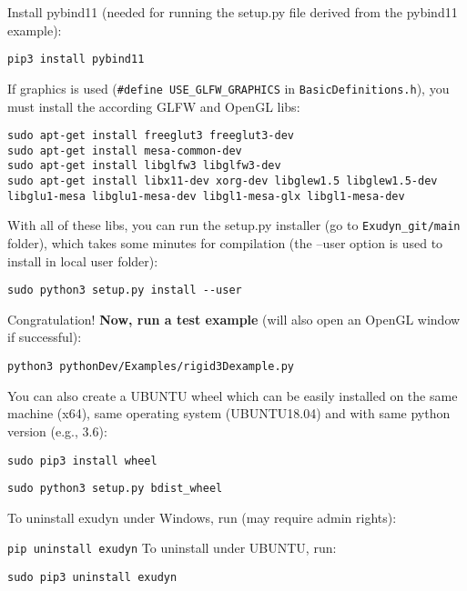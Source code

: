 \noindent Install pybind11 (needed for running the setup.py file derived from the pybind11 example):
\begin{lstlisting}[firstnumber=1]
pip3 install pybind11
\end{lstlisting}

\noindent If graphics is used (\texttt{\#define USE\_GLFW\_GRAPHICS} in \texttt{BasicDefinitions.h}), you must install the according GLFW and OpenGL libs:
\begin{lstlisting}[firstnumber=1]
sudo apt-get install freeglut3 freeglut3-dev
sudo apt-get install mesa-common-dev
sudo apt-get install libglfw3 libglfw3-dev
sudo apt-get install libx11-dev xorg-dev libglew1.5 libglew1.5-dev libglu1-mesa libglu1-mesa-dev libgl1-mesa-glx libgl1-mesa-dev
\end{lstlisting}

\noindent With all of these libs, you can run the setup.py installer (go to \texttt{Exudyn\_git/main} folder), which takes some minutes for compilation (the --user option is used to install in local user folder):
\begin{lstlisting}[firstnumber=1]
sudo python3 setup.py install --user
\end{lstlisting}

\noindent Congratulation! {\bf Now, run a test example} (will also open an OpenGL window if successful):
\bi
  \item[] \texttt{python3 pythonDev/Examples/rigid3Dexample.py}
\ei

\noindent You can also create a UBUNTU wheel which can be easily installed on the same machine (x64), same operating system (UBUNTU18.04) and with same python version (e.g., 3.6):
\bi
  \item[] \texttt{sudo pip3 install wheel}
  \item[] \texttt{sudo python3 setup.py bdist\_wheel}
\ei


To uninstall exudyn under Windows, run (may require admin rights):
\bi
  \item[] \texttt{pip uninstall exudyn}
\ei
\noindent To uninstall under UBUNTU, run:
\bi
  \item[] \texttt{sudo pip3 uninstall exudyn}
\ei

